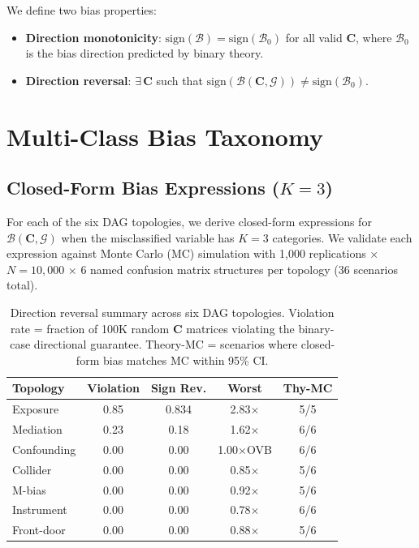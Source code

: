 \documentclass[11pt,letterpaper]{article}
\begin{document}
We define two bias properties:
\begin{itemize}[nosep,leftmargin=*]
\item \textbf{Direction monotonicity}: $\text{sign}(\mathcal{B}) = \text{sign}(\mathcal{B}_0)$ for all valid $\mathbf{C}$, where $\mathcal{B}_0$ is the bias direction predicted by binary theory.
\item \textbf{Direction reversal}: $\exists\, \mathbf{C}$ such that $\text{sign}(\mathcal{B}(\mathbf{C}, \mathcal{G})) \neq \text{sign}(\mathcal{B}_0)$.
\end{itemize}


\section{Multi-Class Bias Taxonomy}
\label{sec:taxonomy}

\subsection{Closed-Form Bias Expressions ($K=3$)}

For each of the six DAG topologies, we derive closed-form expressions for $\mathcal{B}(\mathbf{C}, \mathcal{G})$ when the misclassified variable has $K=3$ categories.
We validate each expression against Monte Carlo (MC) simulation with 1{,}000 replications $\times$ $N=10{,}000$ $\times$ 6 named confusion matrix structures per topology (36 scenarios total).

\begin{table}[t]
\centering
\small
\caption{Direction reversal summary across six DAG topologies. Violation rate = fraction of 100K random $\mathbf{C}$ matrices violating the binary-case directional guarantee. Theory-MC = scenarios where closed-form bias matches MC within 95\% CI.}
\label{tab:reversal}
\begin{tabular}{@{}lcccc@{}}
\toprule
\textbf{Topology} & \textbf{Violation} & \textbf{Sign Rev.} & \textbf{Worst} & \textbf{Thy-MC} \\
\midrule
Exposure & 0.85 & 0.834 & 2.83$\times$ & 5/5 \\
Mediation & 0.23 & 0.18 & 1.62$\times$ & 6/6 \\
Confounding & 0.00 & 0.00 & 1.00$\times$OVB & 6/6 \\
Collider & 0.00 & 0.00 & 0.85$\times$ & 5/6 \\
M-bias & 0.00 & 0.00 & 0.92$\times$ & 5/6 \\
Instrument & 0.00 & 0.00 & 0.78$\times$ & 6/6 \\
Front-door & 0.00 & 0.00 & 0.88$\times$ & 5/6 \\
\bottomrule
\end{tabular}
\end{table}
\end{document}

